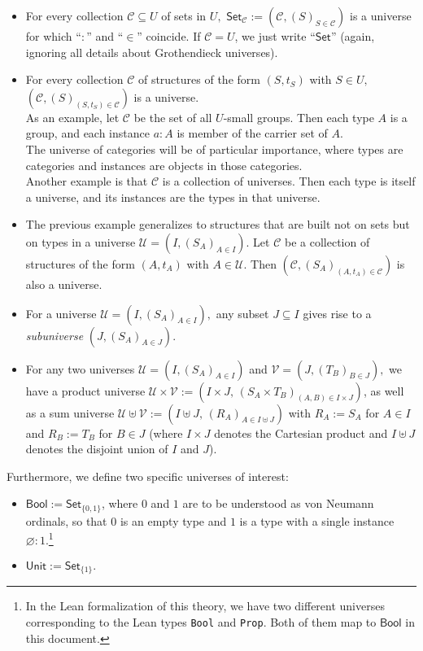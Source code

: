 \documentclass[a4paper]{article}
\theoremstyle{definition}
\theoremstyle{remark}
\newcommand{\defn}{\emph}
\renewcommand{\emptyset}{\varnothing}
\newcommand{\C}{\mathcal{C}}
\newcommand{\U}{\mathcal{U}}
\newcommand{\V}{\mathcal{V}}
\newcommand{\nm}{\mathsf}
\newcommand{\universe}{\nm}
\newcommand{\Unit}{\universe{Unit}}
\newcommand{\Bool}{\universe{Bool}}
\newcommand{\Set}{\universe{Set}}
\newcommand{\Lean}{\texttt}
\begin{document}
\begin{itemize}
  \item For every collection $\C \subseteq U$ of sets in $U,$ $\Set_\C := (\C, (S)_{S \in \C})$ is a
  universe for which ``$:$'' and ``$\in$'' coincide.
  If $\C = U$, we just write ``$\Set$'' (again, ignoring all details about Grothendieck universes).
  \item For every collection $\C$ of structures of the form $(S, t_S)$ with $S \in U,$
  $(\C, (S)_{(S, t_S) \in \C})$ is a universe.\\
  As an example, let $\C$ be the set of all $U$-small groups. Then each type $A$ is a group, and
  each instance $a : A$ is member of the carrier set of $A.$\\
  The universe of categories will be of particular importance, where types are categories and instances
  are objects in those categories.\\
  Another example is that $\C$ is a collection of universes. Then each type is itself a universe, and
  its instances are the types in that universe.
  \item The previous example generalizes to structures that are built not on sets but on types in a
  universe $\U = (I, (S_A)_{A \in I}).$ Let $\C$ be a collection of structures of the form $(A,t_A)$ with
  $A \in \U$. Then $(\C, (S_A)_{(A, t_A) \in \C})$ is also a universe.
  \item For a universe $\U = (I, (S_A)_{A \in I}),$ any subset $J \subseteq I$ gives rise to a
  \defn{subuniverse} $(J, (S_A)_{A \in J}).$
  \item For any two universes $\U = (I, (S_A)_{A \in I})$ and $\V = (J, (T_B)_{B \in J}),$ we have a
  product universe $\U \times \V := (I{\times}J,\,(S_A{\times}T_B)_{(A,B) \in I{\times}J})$, as well as a
  sum universe $\U \uplus \V := (I \uplus J,\,(R_A)_{A \in I \uplus J})$ with $R_A := S_A$ for $A \in I$
  and $R_B := T_B$ for $B \in J$ (where $I \times J$ denotes the Cartesian product and $I \uplus J$
  denotes the disjoint union of $I$ and $J$).
\end{itemize}

Furthermore, we define two specific universes of interest:
\begin{itemize}
  \item $\Bool := \Set_{\{0, 1\}}$, where $0$ and $1$ are to be understood as von Neumann
  ordinals\cite{Ordinals}, so that $0$ is an empty type and $1$ is a type with a single
  instance $\emptyset : 1.$\footnote{In the Lean formalization of this theory, we have two different universes
  corresponding to the Lean types \Lean{Bool} and \Lean{Prop}. Both of them map to $\Bool$ in this document.}
  \item $\Unit := \Set_{\{1\}}.$
\end{itemize}
\end{document}
